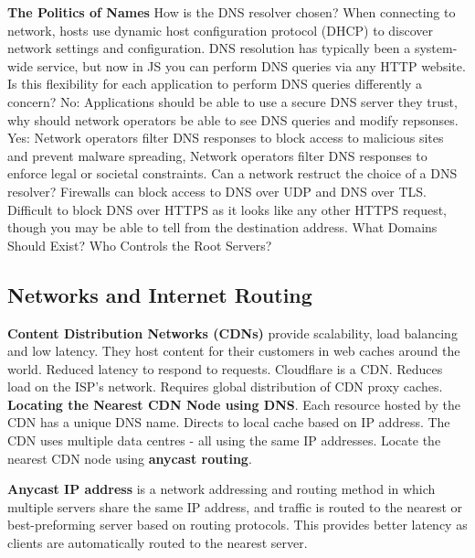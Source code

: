 \documentclass{article}
\begin{document}
\vspace{\baselineskip}
\textbf{The Politics of Names}
How is the DNS resolver chosen? When connecting to network, hosts use dynamic host configuration protocol (DHCP)
to discover network settings and configuration.
DNS resolution has typically been a system-wide service, but now in JS you can perform DNS queries via any HTTP website.
Is this flexibility for each application to perform DNS queries differently a concern?
No: Applications should be able to use a secure DNS server they trust, why should network operators be able to see DNS queries and modify repsonses.
Yes: Network operators filter DNS responses to block access to malicious sites and prevent malware spreading,
Network operators filter DNS responses to enforce legal or societal constraints.
Can a network restruct the choice of a DNS resolver?
Firewalls can block access to DNS over UDP and DNS over TLS\@.
Difficult to block DNS over HTTPS as it looks like any other HTTPS request, though you may be able to tell from the destination address.
What Domains Should Exist?
Who Controls the Root Servers?

\clearpage


\subsection*{Networks and Internet Routing}

\textbf{Content Distribution Networks (CDNs)} provide scalability, load balancing and low latency.
They host content for their customers in web caches around the world.
Reduced latency to respond to requests.
Cloudflare is a CDN\@.
Reduces load on the ISP's network.
Requires global distribution of CDN proxy caches.
\textbf{Locating the Nearest CDN Node using DNS}.
Each resource hosted by the CDN has a unique DNS name.
Directs to local cache based on IP address.
The CDN uses multiple data centres {-} all using the same IP addresses.
Locate the nearest CDN node using \textbf{anycast routing}.

\textbf{Anycast IP address} is a network addressing and routing method in which multiple servers share the same IP address,
and traffic is routed to the nearest or best-preforming server based on routing protocols.
This provides better latency as clients are automatically routed to the nearest server.
\end{document}
